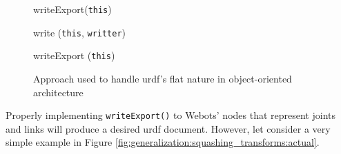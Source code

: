 \begin{figure}[H]
    \begin{minipage}{\linewidth}
    \begin{procedure}[H]
    
        
        
        writeExport(\texttt{this}) \;
        
        \caption{write (\texttt{this}, \texttt{writter})}
    \end{procedure}
    \end{minipage}
    \begin{minipage}{\linewidth}
    \begin{procedure}[H]
        \caption{writeExport (\texttt{this})}
    \end{procedure}
    \end{minipage}
\caption{Approach used to handle \ac{urdf}'s flat nature in object-oriented architecture}
\label{fig:generalization:urdf_flat}
\end{figure}

Properly implementing \texttt{writeExport()} to Webots' nodes that represent joints and links will produce a desired \ac{urdf} document.
However, let consider a very simple example in Figure \ref{fig:generalization:squashing_transforms:actual}.

